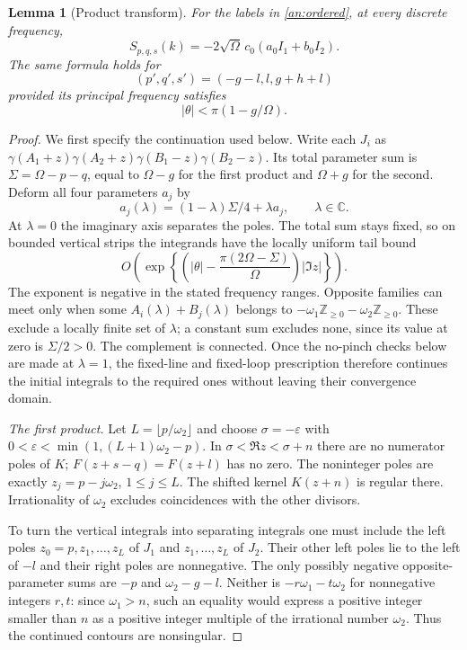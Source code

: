 \documentclass[11pt]{article}
\numberwithin{equation}{section}
\newtheorem{lemma}[theorem]{Lemma}
\theoremstyle{definition}
\theoremstyle{remark}
\newcommand{\Z}{\mathbb Z}
\newcommand{\C}{\mathbb C}
\begin{document}
\begin{lemma}[Product transform]\label{an:product-formula}
For the labels in \eqref{an:ordered}, at every discrete frequency,
\begin{equation}
 S_{p,q,s}(k)=-2\sqrt\Omega\,c_0(a_0I_1+b_0I_2).
 \label{an:product}
\end{equation}
The same formula holds for
\[
 (p',q',s')=(-g-l,l,g+h+l)
\]
provided its principal frequency satisfies
\begin{equation}
 |\theta|<\pi(1-g/\Omega).
 \label{an:frequency}
\end{equation}
\end{lemma}

\begin{proof}
We first specify the continuation used below.  Write each $J_i$ as
$\gamma(A_1+z)\gamma(A_2+z)\gamma(B_1-z)\gamma(B_2-z)$.
Its total parameter sum is $\Sigma=\Omega-p-q$, equal to $\Omega-g$
for the first product and $\Omega+g$ for the second.  Deform all four
parameters $a_j$ by
\[
 a_j(\lambda)=(1-\lambda)\Sigma/4+\lambda a_j,\qquad \lambda\in\C.
\]
At $\lambda=0$ the imaginary axis separates the poles.  The total sum
stays fixed, so on bounded vertical strips the integrands have the
locally uniform tail bound
\[
 O\!\left(\exp\left\{
   \left(|\theta|-\frac{\pi(2\Omega-\Sigma)}{\Omega}\right)|\Im z|
                    \right\}\right).
\]
The exponent is negative in the stated frequency ranges.  Opposite
families can meet only when some $A_i(\lambda)+B_j(\lambda)$ belongs to
$-\omega_1\Z_{\ge0}-\omega_2\Z_{\ge0}$.  These exclude a locally
finite set of $\lambda$; a constant sum excludes none, since its value
at zero is $\Sigma/2>0$.  The complement is connected.  Once the
no-pinch checks below are made at $\lambda=1$, the fixed-line and
fixed-loop prescription therefore continues the initial integrals to
the required ones without leaving their convergence domain.

\emph{The first product.}
Let $L=\lfloor p/\omega_2\rfloor$ and choose
$\sigma=-\varepsilon$ with
$0<\varepsilon<\min(1,(L+1)\omega_2-p)$.
In $\sigma<\Re z<\sigma+n$ there are no numerator poles of $K$;
$F(z+s-q)=F(z+l)$ has no zero.  The noninteger poles are exactly
$z_j=p-j\omega_2$, $1\le j\le L$.  The shifted kernel $K(z+n)$ is
regular there.  Irrationality of $\omega_2$ excludes coincidences with
the other divisors.

To turn the vertical integrals into separating integrals one must
include the left poles $z_0=p,z_1,\ldots,z_L$ of $J_1$ and
$z_1,\ldots,z_L$ of $J_2$.  Their other left poles lie to the left
of $-l$ and their right poles are nonnegative.  The only possibly
negative opposite-parameter sums are $-p$ and $\omega_2-g-l$.
Neither is $-r\omega_1-t\omega_2$ for nonnegative integers $r,t$: since $\omega_1>n$,
such an equality would express a positive integer smaller than $n$
as a positive integer multiple of the irrational number $\omega_2$.
Thus the continued contours are nonsingular.


\end{proof}
\end{document}
